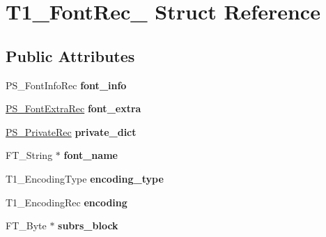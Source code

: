 \hypertarget{struct_t1___font_rec__}{}\section{T1\+\_\+\+Font\+Rec\+\_\+ Struct Reference}
\label{struct_t1___font_rec__}
\subsection*{Public Attributes}
\begin{DoxyCompactItemize}
\item 
P\+S\+\_\+\+Font\+Info\+Rec {\bfseries font\+\_\+info}\hypertarget{struct_t1___font_rec___a38098edc6279f539983e0d4694b9949a}{}\label{struct_t1___font_rec___a38098edc6279f539983e0d4694b9949a}

\item 
\hyperlink{struct_p_s___font_extra_rec__}{P\+S\+\_\+\+Font\+Extra\+Rec} {\bfseries font\+\_\+extra}\hypertarget{struct_t1___font_rec___a8f2f0990ef8ab29e961047b8c2ceca0d}{}\label{struct_t1___font_rec___a8f2f0990ef8ab29e961047b8c2ceca0d}

\item 
\hyperlink{struct_p_s___private_rec__}{P\+S\+\_\+\+Private\+Rec} {\bfseries private\+\_\+dict}\hypertarget{struct_t1___font_rec___a14386570a1b12e477407836e470a258f}{}\label{struct_t1___font_rec___a14386570a1b12e477407836e470a258f}

\item 
F\+T\+\_\+\+String $\ast$ {\bfseries font\+\_\+name}\hypertarget{struct_t1___font_rec___a878fc12d0ddda382ffc09c27a7ed81ad}{}\label{struct_t1___font_rec___a878fc12d0ddda382ffc09c27a7ed81ad}

\item 
T1\+\_\+\+Encoding\+Type {\bfseries encoding\+\_\+type}\hypertarget{struct_t1___font_rec___a20cb798239623daa4ac7fe833a2a9dc9}{}\label{struct_t1___font_rec___a20cb798239623daa4ac7fe833a2a9dc9}

\item 
T1\+\_\+\+Encoding\+Rec {\bfseries encoding}\hypertarget{struct_t1___font_rec___a78de0ca49e25ea59a2736ec5837c77b4}{}\label{struct_t1___font_rec___a78de0ca49e25ea59a2736ec5837c77b4}

\item 
F\+T\+\_\+\+Byte $\ast$ {\bfseries subrs\+\_\+block}\hypertarget{struct_t1___font_rec___a46675e2cba990def15e0ea01b11578a7}{}\label{struct_t1___font_rec___a46675e2cba990def15e0ea01b11578a7}


\end{DoxyCompactItemize}

